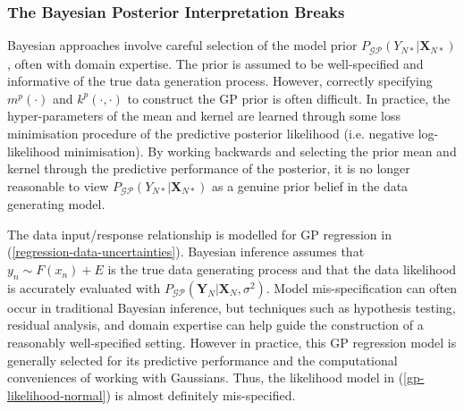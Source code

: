 \documentclass{article}
\newcommand{\GP}{\operatorname{\mathcal{GP}}}
\numberwithin{equation}{section}
\begin{document}
\subsubsection{The Bayesian Posterior Interpretation Breaks}
Bayesian approaches involve careful selection of the model prior $P_{\GP}(Y_{N*}\vert \mathbf{X}_{N*})$, often with domain expertise. The prior is assumed to be well-specified and informative of the true data generation process. However, correctly specifying $m^p(\cdot)$ and $k^p(\cdot, \cdot)$ to construct the GP prior is often difficult. In practice, the hyper-parameters of the mean and kernel are learned through some loss minimisation procedure of the predictive posterior likelihood (i.e. negative log-likelihood minimisation). By working backwards and selecting the prior mean and kernel through the predictive performance of the posterior, it is no longer reasonable to view $P_{\GP}(Y_{N*}\vert \mathbf{X}_{N*})$ as a genuine prior belief in the data generating model.

 The data input/response relationship is modelled for GP regression in (\ref{regression-data-uncertainties}). Bayesian inference assumes that $y_n \sim F(x_n) + E$ is the true data generating process and that the data likelihood is accurately evaluated with $P_{\GP}\left(\mathbf{Y}_N \vert \mathbf{X}_N, \sigma^2\right)$. Model mis-specification can often occur in traditional Bayesian inference, but techniques such as hypothesis testing, residual analysis, and domain expertise can help guide the construction of a reasonably well-specified setting. However in practice, this GP regression model is generally selected for its predictive performance and the computational conveniences of working with Gaussians. Thus, the likelihood model in (\ref{gp-likelihood-normal}) is almost definitely mis-specified. 
 
\end{document}
